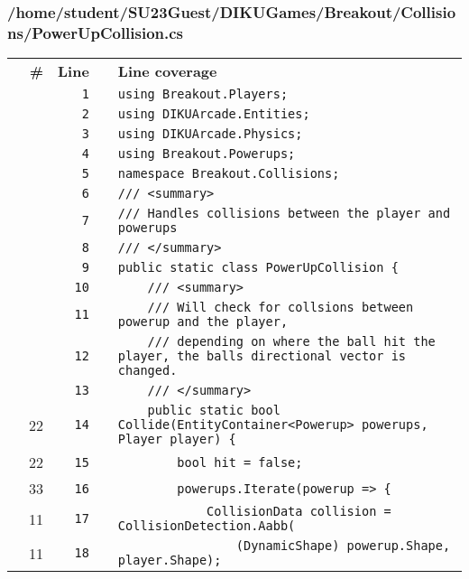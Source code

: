 \documentclass[a4paper,landscape,10pt]{article}
\begin{document}
\subsubsection{/home/student/SU23Guest/DIKUGames/Breakout/Collisions/PowerUpCollision.cs}
\begin{longtable}[l]{lrrll}
\textbf{} & \textbf{\#} & \textbf{Line} & \textbf{} & \textbf{Line coverage}\\
\cellcolor{gray} &  & \verb~1~ & & \verb~using Breakout.Players;~\\
\cellcolor{gray} &  & \verb~2~ & & \verb~using DIKUArcade.Entities;~\\
\cellcolor{gray} &  & \verb~3~ & & \verb~using DIKUArcade.Physics;~\\
\cellcolor{gray} &  & \verb~4~ & & \verb~using Breakout.Powerups;~\\
\cellcolor{gray} &  & \verb~5~ & & \verb~namespace Breakout.Collisions;~\\
\cellcolor{gray} &  & \verb~6~ & & \verb~/// <summary>~\\
\cellcolor{gray} &  & \verb~7~ & & \verb~/// Handles collisions between the player and powerups~\\
\cellcolor{gray} &  & \verb~8~ & & \verb~/// </summary>~\\
\cellcolor{gray} &  & \verb~9~ & & \verb~public static class PowerUpCollision {~\\
\cellcolor{gray} &  & \verb~10~ & & \verb~    /// <summary>~\\
\cellcolor{gray} &  & \verb~11~ & & \verb~    /// Will check for collsions between powerup and the player,~\\
\cellcolor{gray} &  & \verb~12~ & & \verb~    /// depending on where the ball hit the player, the balls directional vector is changed.~\\
\cellcolor{gray} &  & \verb~13~ & & \verb~    /// </summary>~\\
\cellcolor{green} & 22 & \verb~14~ & & \verb~    public static bool Collide(EntityContainer<Powerup> powerups, Player player) {~\\
\cellcolor{green} & 22 & \verb~15~ & & \verb~        bool hit = false;~\\
\cellcolor{green} & 33 & \verb~16~ & & \verb~        powerups.Iterate(powerup => {~\\
\cellcolor{green} & 11 & \verb~17~ & & \verb~            CollisionData collision = CollisionDetection.Aabb(~\\
\cellcolor{green} & 11 & \verb~18~ & & \verb~                (DynamicShape) powerup.Shape, player.Shape);~\\

\end{longtable}
\end{document}
